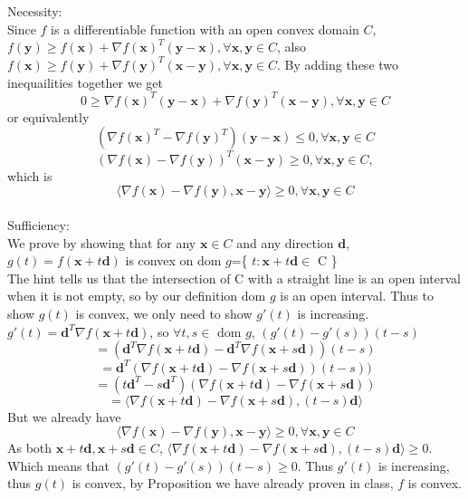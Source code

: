 \documentclass[12pt,letterpaper]{article}
\begin{document}
\section{}
Necessity:\\
Since $f$ is a differentiable function with an open convex domain $C$, $f(\boldsymbol{y})\geq f(\boldsymbol{x})+\nabla f(\boldsymbol{x})^T(\boldsymbol{y}-\boldsymbol{x}),\forall \boldsymbol{x},\boldsymbol{y}\in C$, also $f(\boldsymbol{x})\geq f(\boldsymbol{y})+\nabla f(\boldsymbol{y})^T(\boldsymbol{x}-\boldsymbol{y}),\forall \boldsymbol{x},\boldsymbol{y}\in C$. By adding these two inequailities together we get $$0\geq \nabla f(\boldsymbol{x})^T(\boldsymbol{y}-\boldsymbol{x})+\nabla f(\boldsymbol{y})^T(\boldsymbol{x}-\boldsymbol{y}),\forall \boldsymbol{x},\boldsymbol{y}\in C$$ or equivalently $$(\nabla f(\boldsymbol{x})^T-\nabla f(\boldsymbol{y})^T)(\boldsymbol{y}-\boldsymbol{x})\leq 0,\forall \boldsymbol{x},\boldsymbol{y}\in C$$ 
$$(\nabla f(\boldsymbol{x})-\nabla f(\boldsymbol{y}))^T(\boldsymbol{x}-\boldsymbol{y})\geq 0,\forall \boldsymbol{x},\boldsymbol{y}\in C,$$ which is 
$$\langle\nabla f(\boldsymbol{x})-\nabla f(\boldsymbol{y}),\boldsymbol{x}-\boldsymbol{y}\rangle\geq0, \forall \boldsymbol{x},\boldsymbol{y}\in C$$\\
Sufficiency:\\
We prove by showing that for any $\boldsymbol{x}\in C$ and any direction $\boldsymbol{d}$, $g(t)=f(\boldsymbol{x}+t\boldsymbol{d})$ is convex on dom $g$=\{ $t:\boldsymbol{x}+t\boldsymbol{d}\in$ C \}\\
The hint tells us that the intersection of C with a straight line is an open interval when it is not empty, so by our definition dom $g$ is an open interval. Thus to show $g(t)$ is convex, we only need to show $g'(t)$ is increasing.\\
$g'(t)=\boldsymbol{d}^T\nabla f(\boldsymbol{x}+t\boldsymbol{d})$, so $\forall t,s\in $ dom $g$, $(g'(t)-g'(s))(t-s)$
$$=(\boldsymbol{d}^T\nabla f(\boldsymbol{x}+t\boldsymbol{d})-\boldsymbol{d}^T\nabla f(\boldsymbol{x}+s\boldsymbol{d}))(t-s)$$
$$=\boldsymbol{d}^T(\nabla f(\boldsymbol{x}+t\boldsymbol{d})-\nabla f(\boldsymbol{x}+s\boldsymbol{d}))(t-s))$$
$$=(t\boldsymbol{d}^T-s\boldsymbol{d}^T)(\nabla f(\boldsymbol{x}+t\boldsymbol{d})-\nabla f(\boldsymbol{x}+s\boldsymbol{d}))$$
$$=\langle\nabla f(\boldsymbol{x}+t\boldsymbol{d})-\nabla f(\boldsymbol{x}+s\boldsymbol{d}),(t-s)\boldsymbol{d}\rangle$$
But we already have
$$\langle\nabla f(\boldsymbol{x})-\nabla f(\boldsymbol{y}),\boldsymbol{x}-\boldsymbol{y}\rangle\geq0, \forall \boldsymbol{x},\boldsymbol{y}\in C$$
As both $\boldsymbol{x}+t\boldsymbol{d},\boldsymbol{x}+s\boldsymbol{d}\in C$, $\langle\nabla f(\boldsymbol{x}+t\boldsymbol{d})-\nabla f(\boldsymbol{x}+s\boldsymbol{d}),(t-s)\boldsymbol{d}\rangle\geq0$. Which means that $(g'(t)-g'(s))(t-s)\geq 0$. Thus $g'(t)$ is increasing, thus $g(t)$ is convex, by Proposition we have already proven in class, $f$ is convex.
\end{document}
